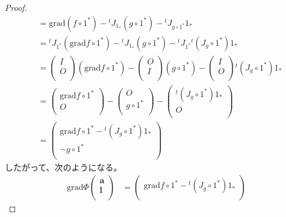 \documentclass[dvipdfmx]{jsarticle}
\begin{document}
\begin{proof}
\begin{align*}
&= \mathrm{grad}\left( f \circ 1^{*} \right) -{}^t J_{1_{*}}\left( g \circ 1^{*} \right) -{}^{t}J_{g \circ 1^{*}}1_{*}\\
&={}^t J_{1^{*}}\left( \mathrm{grad}f \circ 1^{*} \right) -{}^t J_{1_{*}}\left( g \circ 1^{*} \right) -{}^{t}J_{1^{*}}{}^t \left( J_{g} \circ 1^{*} \right)1_{*}\\
&= \begin{pmatrix}
I \\
O \\
\end{pmatrix}\left( \mathrm{grad}f \circ 1^{*} \right) - \begin{pmatrix}
O \\
I \\
\end{pmatrix}\left( g \circ 1^{*} \right) - \begin{pmatrix}
I \\
O \\
\end{pmatrix}{}^t \left( J_{g} \circ 1^{*} \right)1_{*}\\
&= \begin{pmatrix}
\mathrm{grad}f \circ 1^{*} \\
O \\
\end{pmatrix} - \begin{pmatrix}
O \\
g \circ 1^{*} \\
\end{pmatrix} - \begin{pmatrix}
{}^t \left( J_{g} \circ 1^{*} \right)1_{*} \\
O \\
\end{pmatrix}\\
&= \begin{pmatrix}
\mathrm{grad}f \circ 1^{*} -{}^t \left( J_{g} \circ 1^{*} \right)1_{*} \\
 - g \circ 1^{*} \\
\end{pmatrix}
\end{align*}
したがって、次のようになる。
\begin{align*}
\mathrm{grad}\varPhi\begin{pmatrix}
\mathbf{a} \\
\mathbf{l} \\
\end{pmatrix} &= \begin{pmatrix}
\mathrm{grad}f \circ 1^{*} -{}^t \left( J_{g} \circ 1^{*} \right)1_{*} \\

\end{pmatrix}
\end{align*}
\end{proof}
\end{document}
